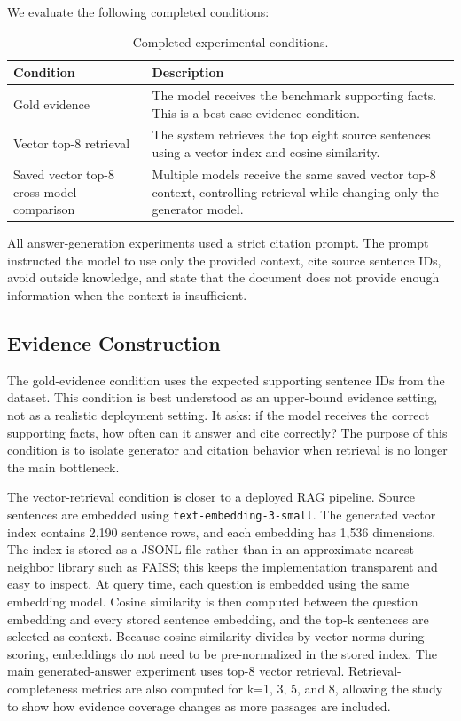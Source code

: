 \documentclass[10pt,twocolumn]{article}
\begin{document}
We evaluate the following completed conditions:

\begin{table}[t]
\centering
\begin{tabular}{p{}p{}}
\toprule
\textbf{Condition} & \textbf{Description} \\
\midrule
Gold evidence & The model receives the benchmark supporting facts. This is a best-case evidence condition. \\
Vector top-8 retrieval & The system retrieves the top eight source sentences using a vector index and cosine similarity. \\
Saved vector top-8 cross-model comparison & Multiple models receive the same saved vector top-8 context, controlling retrieval while changing only the generator model. \\
\bottomrule
\end{tabular}
\caption{Completed experimental conditions.}
\label{tab:conditions}
\end{table}

All answer-generation experiments used a strict citation prompt. The prompt instructed the model to use only the provided context, cite source sentence IDs, avoid outside knowledge, and state that the document does not provide enough information when the context is insufficient.

\subsection{Evidence Construction}

The gold-evidence condition uses the expected supporting sentence IDs from the dataset. This condition is best understood as an upper-bound evidence setting, not as a realistic deployment setting. It asks: if the model receives the correct supporting facts, how often can it answer and cite correctly? The purpose of this condition is to isolate generator and citation behavior when retrieval is no longer the main bottleneck.

The vector-retrieval condition is closer to a deployed RAG pipeline. Source sentences are embedded using \texttt{text-embedding-3-small}. The generated vector index contains 2,190 sentence rows, and each embedding has 1,536 dimensions. The index is stored as a JSONL file rather than in an approximate nearest-neighbor library such as FAISS; this keeps the implementation transparent and easy to inspect. At query time, each question is embedded using the same embedding model. Cosine similarity is then computed between the question embedding and every stored sentence embedding, and the top-k sentences are selected as context. Because cosine similarity divides by vector norms during scoring, embeddings do not need to be pre-normalized in the stored index. The main generated-answer experiment uses top-8 vector retrieval. Retrieval-completeness metrics are also computed for k=1, 3, 5, and 8, allowing the study to show how evidence coverage changes as more passages are included.
\end{document}
